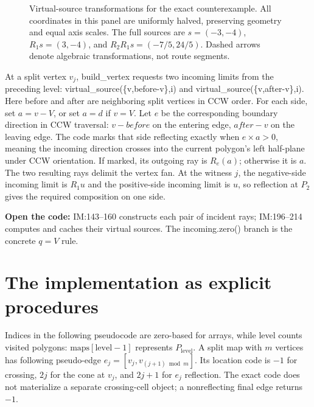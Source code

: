 \documentclass[12pt,a4paper]{article}
\newcommand{\cross}{\mathbin{\times}}
\newcommand{\code}[1]{{\ttfamily\color{codekw}#1}}
\begin{document}
\begin{figure}[h]\centering\figvirtual\caption{Virtual-source transformations for the exact counterexample. All coordinates in this panel are uniformly halved, preserving geometry and equal axis scales. The full sources are \(s=(-3,-4)\), \(R_1s=(3,-4)\), and \(R_2R_1s=(-7/5,24/5)\). Dashed arrows denote algebraic transformations, not route segments.}\label{fig:virtual}\end{figure}

At a split vertex \(v_j\), \code{build\_vertex} requests two incoming limits from the preceding level: \code{virtual\_source(\{v,before-v\},i)} and \code{virtual\_source(\{v,after-v\},i)}. Here \code{before} and \code{after} are neighboring split vertices in CCW order. For each side, set \(a=v-V\), or set \(a=d\) if \(v=V\). Let \(e\) be the corresponding boundary direction in CCW traversal: \(v-before\) on the entering edge, \(after-v\) on the leaving edge. The code marks that side reflecting exactly when \(e\cross a>0\), meaning the incoming direction crosses into the current polygon's left half-plane under CCW orientation. If marked, its outgoing ray is \(R_e(a)\); otherwise it is \(a\). The two resulting rays delimit the vertex fan. At the witness \(j\), the negative-side incoming limit is \(R_1u\) and the positive-side incoming limit is \(u\), so reflection at \(P_2\) gives the required composition on one side.
\begin{sourcebox}
\textbf{Open the code:} \code{IM:143--160} constructs each pair of incident rays; \code{IM:196--214} computes and caches their virtual sources. The \code{incoming.zero()} branch is the concrete \(q=V\) rule.
\end{sourcebox}

\section{The implementation as explicit procedures}
Indices in the following pseudocode are zero-based for arrays, while \code{level} counts visited polygons: \(\mathrm{maps}[\mathrm{level}-1]\) represents \(P_{\mathrm{level}}\). A split map with \(m\) vertices has following pseudo-edge \(e_j=[v_j,v_{(j+1)\bmod m}]\). Its location code is \(-1\) for crossing, \(2j\) for the cone at \(v_j\), and \(2j+1\) for \(e_j\) reflection. The exact code does not materialize a separate crossing-cell object; a nonreflecting final edge returns \(-1\).
\end{document}
